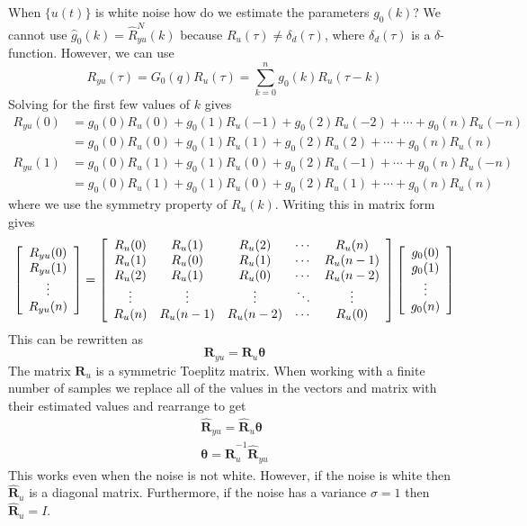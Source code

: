 When $\{u(t)\}$ is white noise how do we estimate the parameters $g_0(k)$? We cannot use $\hat{g}_0(k) = \hat{R}_{yu}^N(k)$ because $R_u(\tau)\neq \delta_d(\tau)$, where $\delta_d(\tau)$ is a $\delta$-function. However, we can use
$$R_{yu}(\tau) = G_0(q)R_u(\tau) = \sum_{k=0}^ng_0(k)R_u(\tau-k)$$
Solving for the first few values of $k$ gives
\begin{align*}
R_{yu}(0) &= g_0(0)R_u(0) + g_0(1)R_u(-1) + g_0(2)R_u(-2) + \cdots + g_0(n)R_u(-n) \\
&= g_0(0)R_u(0) + g_0(1)R_u(1) + g_0(2)R_u(2) + \cdots + g_0(n)R_u(n) \\
R_{yu}(1) &= g_0(0)R_u(1) + g_0(1)R_u(0) + g_0(2)R_u(-1) + \cdots + g_0(n)R_u(-n) \\
&= g_0(0)R_u(1) + g_0(1)R_u(0) + g_0(2)R_u(1) + \cdots + g_0(n)R_u(n)
\end{align*}
where we use the symmetry property of $R_u(k)$. Writing this in matrix form gives
\begin{align*}
\left[\begin{array}{c}
R_{yu}(0) \\ R_{yu}(1) \\ \vdots \\ R_{yu}(n)
\end{array}\right] =
\left[\begin{array}{c c c c c}
R_u(0) & R_u(1) & R_u(2) & \cdots & R_u(n) \\
R_u(1) & R_u(0) & R_u(1) & \cdots & R_u(n-1) \\
R_u(2) & R_u(1) & R_u(0) & \cdots & R_u(n-2) \\
\vdots & \vdots & \vdots & \ddots & \vdots \\
R_u(n) & R_u(n-1) & R_u(n-2) & \cdots & R_u(0)
\end{array}\right]
\left[\begin{array}{c}
g_0(0) \\ g_0(1) \\ \vdots \\ g_0(n)
\end{array}\right]
\end{align*}
This can be rewritten as
$$\mathbf{R}_{yu} = \mathbf{R}_u\mathbf{\theta}$$
The matrix $\mathbf{R}_u$ is a symmetric Toeplitz matrix. When working with a finite number of samples we replace all of the values in the vectors and matrix with their estimated values and rearrange to get
\begin{align*}
\hat{\mathbf{R}}_{yu} = \hat{\mathbf{R}}_u\mathbf{\theta} \\
\mathbf{\theta} = \hat{\mathbf{R}}_u^{-1}\hat{\mathbf{R}}_{yu}
\end{align*}
This works even when the noise is not white. However, if the noise is white then $\hat{\mathbf{R}}_u$ is a diagonal matrix. Furthermore, if the noise has a variance $\sigma=1$ then $\hat{\mathbf{R}}_u=I$.

